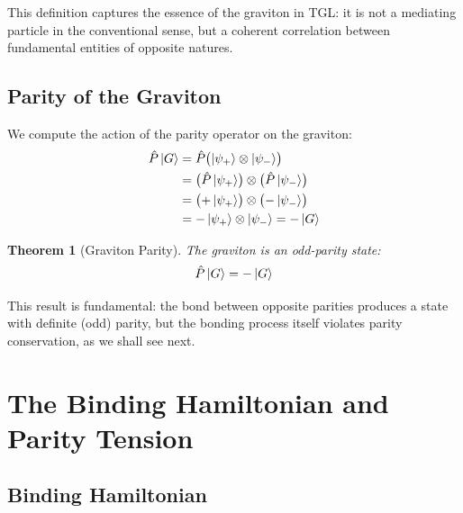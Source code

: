 \documentclass[12pt,a4paper,twoside]{article}
\newtheorem{theorem}{Theorem}[section]
\newcommand{\psion}{\psi}
\begin{document}
\noindent This definition captures the essence of the graviton in TGL: it is not a mediating particle in the conventional sense, but a coherent correlation between fundamental entities of opposite natures.

\subsection{Parity of the Graviton}

We compute the action of the parity operator on the graviton:
\begin{align}
\hat{P}\ket{G} &= \hat{P}\bigl(\ket{\psion_+} \otimes \ket{\psion_-}\bigr) \notag \\
&= \bigl(\hat{P}\ket{\psion_+}\bigr) \otimes \bigl(\hat{P}\ket{\psion_-}\bigr) \notag \\
&= \bigl(+\ket{\psion_+}\bigr) \otimes \bigl(-\ket{\psion_-}\bigr) \notag \\
&= -\ket{\psion_+} \otimes \ket{\psion_-} = -\ket{G}
\label{eq:paridade_graviton}
\end{align}

\begin{resultbox}[title={Theorem 1 --- Graviton Parity}]
\begin{theorem}[Graviton Parity]\label{thm:paridade}
The graviton is an odd-parity state:
\begin{equation}
\hat{P}\ket{G} = -\ket{G}
\end{equation}
\end{theorem}
\end{resultbox}

\noindent This result is fundamental: the bond between opposite parities produces a state with definite (odd) parity, but the bonding process itself violates parity conservation, as we shall see next.


\section{The Binding Hamiltonian and Parity Tension}


\subsection{Binding Hamiltonian}
\end{document}
